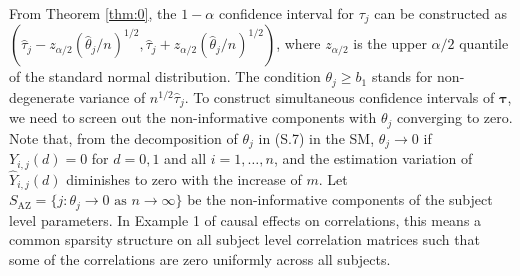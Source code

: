 \documentclass[12pt]{article}
\def\be{\begin{equation}}
\def\ee{\end{equation}}
\def\AZ{{ \mathrm{\scriptscriptstyle AZ} }}
\theoremstyle{definition}
\newcommand{\V}{\rm Var}
\newcommand{\btau}{\boldsymbol{\tau}}
\begin{document}
From Theorem \ref{thm:0}, the $1 - \alpha$ confidence interval for $\tau_j$ can be constructed as $(\hat{\tau}_j - z_{\alpha / 2} (\hat{\theta}_j / n)^{1/2}, \hat{\tau}_j + z_{\alpha / 2} (\hat{\theta}_j / n)^{1/2})$, where $z_{\alpha / 2}$ is the upper $\alpha / 2$ quantile of the standard normal distribution. 
The condition $\theta_j \geq b_1$ stands for non-degenerate variance of $n^{1/2}\hat{\tau}_j$.
To construct simultaneous confidence intervals of $\btau$, we need to screen out the non-informative components with $\theta_j$ converging to zero.
Note that, from the decomposition of $\theta_j$ in (S.7) in the SM, $\theta_j \to 0$ if $Y_{i, j}(d) = 0$ for $d = 0, 1$ and all $i = 1, \ldots, n$, and the estimation variation of $\hat{Y}_{i,j}(d)$ diminishes to zero with the increase of $m$.
Let $S_{\AZ} = \{j : \theta_j \to 0 \mbox{ \ as \ } n \to \infty \}$ 
be the non-informative components of the subject level parameters. 
In Example 1 of causal effects on correlations, this means a common sparsity structure on all subject level correlation matrices such that some of the correlations are zero uniformly across all subjects.

\end{document}
